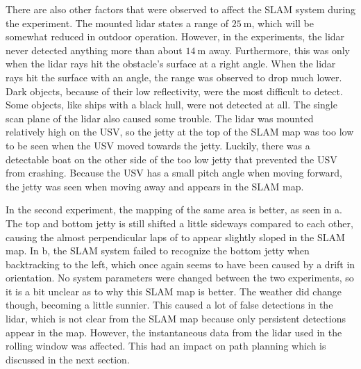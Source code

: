 There are also other factors that were observed to affect the SLAM system during the experiment. The mounted lidar states a range of $\SI{25}{\meter}$, which will be somewhat reduced in outdoor operation. However, in the experiments, the lidar never detected anything more than about $\SI{14}{\meter}$ away. Furthermore, this was only when the lidar rays hit the obstacle's surface at a right angle. When the lidar rays hit the surface with an angle, the range was observed to drop much lower. Dark objects, because of their low reflectivity, were the most difficult to detect. Some objects, like ships with a black hull, were not detected at all. The single scan plane of the lidar also caused some trouble. The lidar was mounted relatively high on the USV, so the jetty at the top of the SLAM map was too low to be seen when the USV moved towards the jetty. Luckily, there was a detectable boat on the other side of the too low jetty that prevented the USV from crashing. Because the USV has a small pitch angle when moving forward, the jetty was seen when moving away and appears in the SLAM map. 

In the second experiment, the mapping of the same area is better, as seen in a. The top and bottom jetty is still shifted a little sideways compared to each other, causing the almost perpendicular laps of  to appear slightly sloped in the SLAM map. In b, the SLAM system failed to recognize the bottom jetty when backtracking to the left, which once again seems to have been caused by a drift in orientation. No system parameters were changed between the two experiments, so it is a bit unclear as to why this SLAM map is better. The weather did change though, becoming a little sunnier. This caused a lot of false detections in the lidar, which is not clear from the SLAM map because only persistent detections appear in the map. However, the instantaneous data from the lidar used in the rolling window was affected. This had an impact on path planning which is discussed in the next section.

